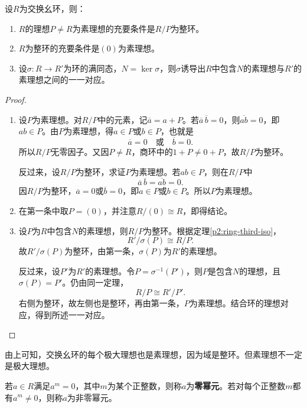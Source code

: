 \begin{theorem}\label{p2:prime-domain}
设$R$为交换幺环，则：
\begin{enumerate}
\item $R$的理想$P\ne R$为素理想的充要条件是$R/P$为整环。
\item $R$为整环的充要条件是$(0)$为素理想。
\item 设$\sigma:R\to R'$为环的满同态，$N=\ker\sigma$，则$\sigma$诱导出$R$中包含$N$的素理想与$R'$的素理想之间的一一对应。
\end{enumerate}
\end{theorem}
\begin{proof}
	\begin{enumerate}
		\item 设$P$为素理想。对$R/P$中的元素，记$\overline a=a+P$。若$\overline a\,\overline b=0$，则$\overline{ab}=0$，即$ab\in P$。由$P$为素理想，得$a\in P$或$b\in P$，也就是
		\[
		\overline a=0\quad\text{或}\quad\overline b=0.
		\]
		所以$R/P$无零因子。又因$P\ne R$，商环中的$1+P\ne0+P$，故$R/P$为整环。
		
		反过来，设$R/P$为整环，求证$P$为素理想。若$ab\in P$，则在$R/P$中
		\[
		\overline a\,\overline b=\overline{ab}=0.
		\]
		因$R/P$为整环，$\overline a=0$或$\overline b=0$，即$a\in P$或$b\in P$。所以$P$为素理想。
		\item 在第一条中取$P=(0)$，并注意$R/(0)\cong R$，即得结论。
		\item 设$P$为$R$中包含$N$的素理想，则$R/P$为整环。根据定理\ref{p2:ring-third-iso}，
		\[
		R'/\sigma(P)\cong R/P.
		\]
		故$R'/\sigma(P)$为整环，由第一条，$\sigma(P)$为$R'$的素理想。
		
		反过来，设$P'$为$R'$的素理想。令$P=\sigma^{-1}(P')$，则$P$是包含$N$的理想，且$\sigma(P)=P'$。仍由同一定理，
		\[
		R/P\cong R'/P'.
		\]
		右侧为整环，故左侧也是整环，再由第一条，$P$为素理想。结合环的理想对应，得到所述一一对应。
	\end{enumerate}
\end{proof}

由上可知，交换幺环的每个极大理想也是素理想，因为域是整环。但素理想不一定是极大理想。

\begin{definition}\label{p2:concept:c3-nilpotent}
若$a\in R$满足$a^m=0$，其中$m$为某个正整数，则称$a$为\textbf{零幂元}。若对每个正整数$m$都有$a^m\ne0$，则称$a$为非零幂元。
\end{definition}


